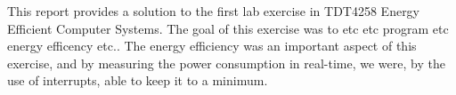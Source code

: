 This report provides a solution to the first lab exercise in TDT4258 Energy Efficient
Computer Systems. The goal of this exercise was to etc etc program etc energy efficency etc.. The energy efficiency was an important aspect of this exercise, and by measuring the power consumption in real-time, we were, by the use of interrupts, able to keep it to a minimum.
